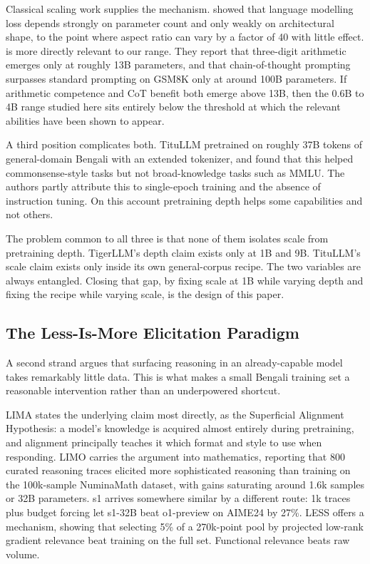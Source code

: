 Classical scaling work supplies the mechanism. \textcite{kaplan2020scaling} %
showed that language modelling loss depends strongly on parameter count and only
weakly on architectural shape, to the point where aspect ratio can vary by a
factor of 40 with little effect. \textcite{wei2022emergent} %
is more directly relevant to our range. They report that three-digit arithmetic
emerges only at roughly 13B parameters, and that chain-of-thought prompting
surpasses standard prompting on GSM8K only at around 100B parameters. If
arithmetic competence and CoT benefit both emerge above 13B, then the 0.6B to 4B
range studied here sits entirely below the threshold at which the relevant
abilities have been shown to appear.

A third position complicates both. TituLLM \parencite{nahin2025titullm}
pretrained on roughly 37B tokens of general-domain Bengali with an extended
tokenizer, and found that this helped commonsense-style tasks but not
broad-knowledge tasks such as MMLU. The authors partly attribute this to
single-epoch training and the absence of instruction tuning. On this account
pretraining depth helps some capabilities and not others.

The problem common to all three is that none of them isolates scale from
pretraining depth. TigerLLM's depth claim exists only at 1B and 9B. TituLLM's
scale claim exists only inside its own general-corpus recipe. The two variables
are always entangled. Closing that gap, by fixing scale at 1B while varying
depth and fixing the recipe while varying scale, is the design of this paper.

\subsection{The Less-Is-More Elicitation Paradigm}

A second strand argues that surfacing reasoning in an already-capable model
takes remarkably little data. This is what makes a small Bengali training set a
reasonable intervention rather than an underpowered shortcut.

LIMA \parencite{zhou2023lima} %
states the underlying claim most directly, as the Superficial Alignment
Hypothesis: a model's knowledge is acquired almost entirely during pretraining,
and alignment principally teaches it which format and style to use when
responding. LIMO \parencite{ye2025limo} carries the argument into mathematics,
reporting that 800 curated reasoning traces elicited more sophisticated
reasoning than training on the 100k-sample NuminaMath dataset, with gains
saturating around 1.6k samples or 32B parameters. s1
\parencite{muennighoff2025s1} arrives somewhere similar by a different route:
1k traces plus budget forcing let s1-32B beat o1-preview on AIME24 by 27\%. LESS
\parencite{xia2024less} offers a mechanism, showing that selecting 5\% of a
270k-point pool by projected low-rank gradient relevance beat training on the
full set. Functional relevance beats raw volume.

